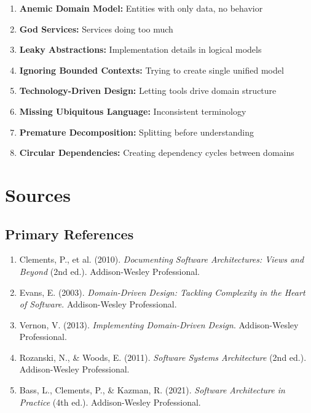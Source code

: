 \documentclass[11pt,letterpaper]{article}
\begin{document}
\begin{warningbox}
\begin{enumerate}[nosep]
    \item \textbf{Anemic Domain Model:} Entities with only data, no behavior
    \item \textbf{God Services:} Services doing too much
    \item \textbf{Leaky Abstractions:} Implementation details in logical models
    \item \textbf{Ignoring Bounded Contexts:} Trying to create single unified model
    \item \textbf{Technology-Driven Design:} Letting tools drive domain structure
    \item \textbf{Missing Ubiquitous Language:} Inconsistent terminology
    \item \textbf{Premature Decomposition:} Splitting before understanding
    \item \textbf{Circular Dependencies:} Creating dependency cycles between domains
\end{enumerate}
\end{warningbox}

\section{Sources}

\subsection{Primary References}

\begin{enumerate}
    \item Clements, P., et al. (2010). \textit{Documenting Software Architectures: Views and Beyond} (2nd ed.). Addison-Wesley Professional.
    
    \item Evans, E. (2003). \textit{Domain-Driven Design: Tackling Complexity in the Heart of Software}. Addison-Wesley Professional.
    
    \item Vernon, V. (2013). \textit{Implementing Domain-Driven Design}. Addison-Wesley Professional.
    
    \item Rozanski, N., \& Woods, E. (2011). \textit{Software Systems Architecture} (2nd ed.). Addison-Wesley Professional.
    
    \item Bass, L., Clements, P., \& Kazman, R. (2021). \textit{Software Architecture in Practice} (4th ed.). Addison-Wesley Professional.
\end{enumerate}
\end{document}
